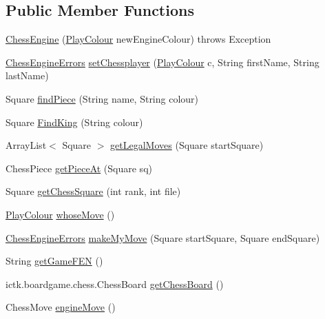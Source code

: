 \subsection*{Public Member Functions}
\begin{DoxyCompactItemize}
\item 
\hyperlink{classswantech_1_1_chess_engine_a206b7f60195b050af7bf73124a359bd5}{Chess\+Engine} (\hyperlink{enumswantech_1_1_play_colour}{Play\+Colour} new\+Engine\+Colour)  throws Exception     
\item 
\hyperlink{enumswantech_1_1_chess_engine_errors}{Chess\+Engine\+Errors} \hyperlink{classswantech_1_1_chess_engine_aa5030a1e441c0868999509e35652636c}{set\+Chessplayer} (\hyperlink{enumswantech_1_1_play_colour}{Play\+Colour} c, String first\+Name, String last\+Name)
\item 
Square \hyperlink{classswantech_1_1_chess_engine_aa9586accdd914705d51e7f2097f57355}{find\+Piece} (String name, String colour)
\item 
Square \hyperlink{classswantech_1_1_chess_engine_a014e771d961f0dccada1b009242b8289}{Find\+King} (String colour)
\item 
Array\+List$<$ Square $>$ \hyperlink{classswantech_1_1_chess_engine_a529858ea407075c6a4daf04d5b3dd51e}{get\+Legal\+Moves} (Square start\+Square)
\item 
Chess\+Piece \hyperlink{classswantech_1_1_chess_engine_ad09f3dd52a728a42cdb1515e7104f03e}{get\+Piece\+At} (Square sq)
\item 
Square \hyperlink{classswantech_1_1_chess_engine_a67cbcb3acff7c6e81281433bfcab6f9d}{get\+Chess\+Square} (int rank, int file)
\item 
\hyperlink{enumswantech_1_1_play_colour}{Play\+Colour} \hyperlink{classswantech_1_1_chess_engine_ae6976be646e833558d31d2e3bf242773}{whose\+Move} ()
\item 
\hyperlink{enumswantech_1_1_chess_engine_errors}{Chess\+Engine\+Errors} \hyperlink{classswantech_1_1_chess_engine_a0e8106f504de2a1cec26d523865c3d02}{make\+My\+Move} (Square start\+Square, Square end\+Square)
\item 
String \hyperlink{classswantech_1_1_chess_engine_a06277d63732bbc472ad1a61e0f5e5ae8}{get\+Game\+F\+E\+N} ()
\item 
ictk.\+boardgame.\+chess.\+Chess\+Board \hyperlink{classswantech_1_1_chess_engine_a5da88bbf80cf6d33938067237b10f44c}{get\+Chess\+Board} ()
\item 
Chess\+Move \hyperlink{classswantech_1_1_chess_engine_a4e2edbbc872baf9bd0f180a132090584}{engine\+Move} ()
\end{DoxyCompactItemize}
